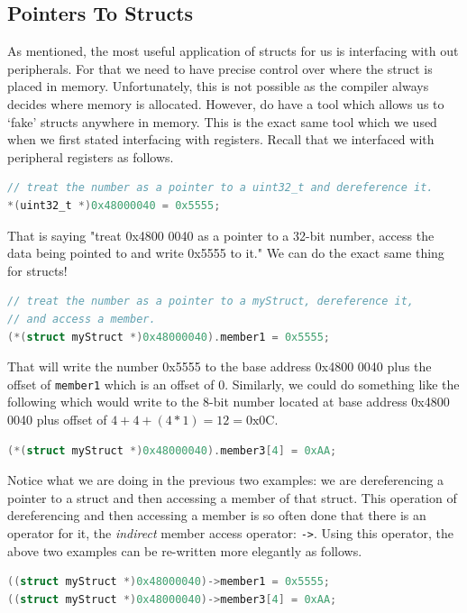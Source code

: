 \subsection{Pointers To Structs}
As mentioned, the most useful application of structs for us is interfacing with out peripherals. For that we need to have precise control over where the struct is placed in memory. Unfortunately, this is not possible as the compiler always decides where memory is allocated. 
However, do have a tool which allows us to `fake' structs anywhere in memory. This is the exact same tool which we used when we first stated interfacing with registers.
Recall that we interfaced with peripheral registers as follows.

\begin{lstlisting}[language=C]
// treat the number as a pointer to a uint32_t and dereference it.
*(uint32_t *)0x48000040 = 0x5555;
\end{lstlisting}

That is saying "treat 0x4800 0040 as a pointer to a 32-bit number, access the data being pointed to and write 0x5555 to it." We can do the exact same thing for structs!
\begin{lstlisting}[language=C]
// treat the number as a pointer to a myStruct, dereference it,
// and access a member.
(*(struct myStruct *)0x48000040).member1 = 0x5555;  
\end{lstlisting}

That will write the number 0x5555 to the base address 0x4800 0040 plus the offset of \texttt{member1} which is an offset of 0.
Similarly, we could do something like the following which would write to the 8-bit number located at base address 0x4800 0040 plus offset of $4 + 4 + (4*1) = 12 = \text{0x0C}$. 
\begin{lstlisting}[language=C]
(*(struct myStruct *)0x48000040).member3[4] = 0xAA;  
\end{lstlisting}

Notice what we are doing in the previous two examples: we are dereferencing a pointer to a struct and then accessing a member of that struct.
This operation of dereferencing and then accessing a member is so often done that there is an operator for it, the \emph{indirect} member access operator: \texttt{->}.
Using this operator, the above two examples can be re-written more elegantly as follows.
\begin{lstlisting}[language=C]
((struct myStruct *)0x48000040)->member1 = 0x5555;  
((struct myStruct *)0x48000040)->member3[4] = 0xAA;  
\end{lstlisting}

